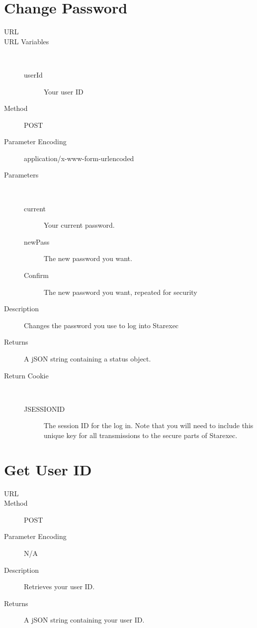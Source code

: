 \section{Change Password}
\begin{description}
\item [URL] 
\item [URL Variables] \
	\begin{description}
	\item [userId]  Your user ID
	\end{description}
\item [Method] POST
\item [Parameter Encoding] application/x-www-form-urlencoded
\item [Parameters] \
	\begin{description}
	\item [current]  Your current password.
	\item [newPass]  The new password you want.
	\item [Confirm] \type{String} The new password you want, repeated for security
	\end{description}
\item [Description] Changes the password you use to log into Starexec
\item [Returns] A jSON string containing a status object.
\item [Return Cookie] \
	\begin{description}
	\item [JSESSIONID] \type{String} The session ID for the log in. Note that you will need to include this unique key for all transmissions to the secure parts of Starexec.
	\end{description}
\end{description}


\section{Get User ID}
\begin{description}
\item [URL] 
\item [Method] POST
\item [Parameter Encoding] N/A
\item [Description] Retrieves your user ID.
\item [Returns] A jSON string containing your user ID.
\end{description}


